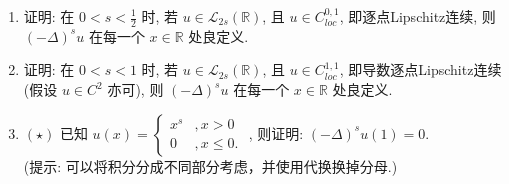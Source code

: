 \begin{enumerate}
    \item[1.]证明: 在 \(\displaystyle 0< s< \frac{1}{2}\) 时, 若 \(u\in \mathcal{L}_{2s}(\mathbb{R})\), 且 \(\displaystyle u\in C_{l o c}^{0,1}\), 即逐点Lipschitz连续, 则 \((-\Delta)^{s}u\) 在每一个 \(x\in \mathbb{R}\) 处良定义.
    \item[2.]证明: 在 \(0< s< 1\) 时, 若 \(\displaystyle u\in \mathcal{L}_{2s}(\mathbb{R})\), 且 \(\displaystyle u\in C_{l o c}^{1,1}\), 即导数逐点Lipschitz连续 (假设 \(u\in C^{2}\) 亦可), 则 \((-\Delta)^{s}u\) 在每一个 \(x\in \mathbb{R}\) 处良定义.
    \item[3.]$(\star)$ 已知 
    \(\displaystyle u(x) = 
    \begin{cases}
            x^{s} &, x > 0 \\ 
            0 &, x \leq 0.
    \end{cases}\)
    , 则证明: \(\displaystyle(-\Delta)^{s}u(1) = 0\). \\
    (提示: 可以将积分分成不同部分考虑，并使用代换换掉分母.)
\end{enumerate}
